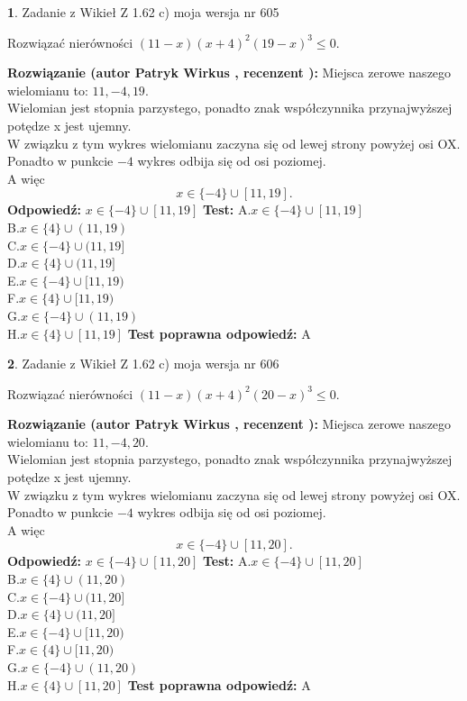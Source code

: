 \documentclass[12pt, a4paper]{article}
\theoremstyle{definition} %
\newtheorem{zad}{}
\newcommand{\zadStart}[1]{\begin{zad}#1\newline}
\newcommand{\zadStop}{\end{zad}}
\newcommand{\rozwStart}[2]{\noindent \textbf{Rozwiązanie (autor #1 , recenzent #2): }\newline}
\newcommand{\rozwStop}{\newline}
\newcommand{\odpStart}{\noindent \textbf{Odpowiedź:}\newline}
\newcommand{\odpStop}{\newline}
\newcommand{\testStart}{\noindent \textbf{Test:}\newline}
\newcommand{\testStop}{\newline}
\newcommand{\kluczStart}{\noindent \textbf{Test poprawna odpowiedź:}\newline}
\newcommand{\kluczStop}{\newline}
\begin{document}
\zadStart{Zadanie z Wikieł Z 1.62 c) moja wersja nr 605}

Rozwiązać nierówności $(11-x)(x+4)^{2}(19-x)^{3}\le0$.
\zadStop
\rozwStart{Patryk Wirkus}{}
Miejsca zerowe naszego wielomianu to: $11, -4, 19$.\\
Wielomian jest stopnia parzystego, ponadto znak współczynnika przy\linebreak najwyższej potędze x jest ujemny.\\ W związku z tym wykres wielomianu zaczyna się od lewej strony powyżej osi OX.\\
Ponadto w punkcie $-4$ wykres odbija się od osi poziomej.\\
A więc $$x \in \{-4\} \cup [11,19].$$
\rozwStop
\odpStart
$x \in \{-4\} \cup [11,19]$
\odpStop
\testStart
A.$x \in \{-4\} \cup [11,19]$\\
B.$x \in \{4\} \cup (11,19)$\\
C.$x \in \{-4\} \cup (11,19]$\\
D.$x \in \{4\} \cup (11,19]$\\
E.$x \in \{-4\} \cup [11,19)$\\
F.$x \in \{4\} \cup [11,19)$\\
G.$x \in \{-4\} \cup (11,19)$\\
H.$x \in \{4\} \cup [11,19]$
\testStop
\kluczStart
A
\kluczStop



\zadStart{Zadanie z Wikieł Z 1.62 c) moja wersja nr 606}

Rozwiązać nierówności $(11-x)(x+4)^{2}(20-x)^{3}\le0$.
\zadStop
\rozwStart{Patryk Wirkus}{}
Miejsca zerowe naszego wielomianu to: $11, -4, 20$.\\
Wielomian jest stopnia parzystego, ponadto znak współczynnika przy\linebreak najwyższej potędze x jest ujemny.\\ W związku z tym wykres wielomianu zaczyna się od lewej strony powyżej osi OX.\\
Ponadto w punkcie $-4$ wykres odbija się od osi poziomej.\\
A więc $$x \in \{-4\} \cup [11,20].$$
\rozwStop
\odpStart
$x \in \{-4\} \cup [11,20]$
\odpStop
\testStart
A.$x \in \{-4\} \cup [11,20]$\\
B.$x \in \{4\} \cup (11,20)$\\
C.$x \in \{-4\} \cup (11,20]$\\
D.$x \in \{4\} \cup (11,20]$\\
E.$x \in \{-4\} \cup [11,20)$\\
F.$x \in \{4\} \cup [11,20)$\\
G.$x \in \{-4\} \cup (11,20)$\\
H.$x \in \{4\} \cup [11,20]$
\testStop
\kluczStart
A
\kluczStop
\end{document}
